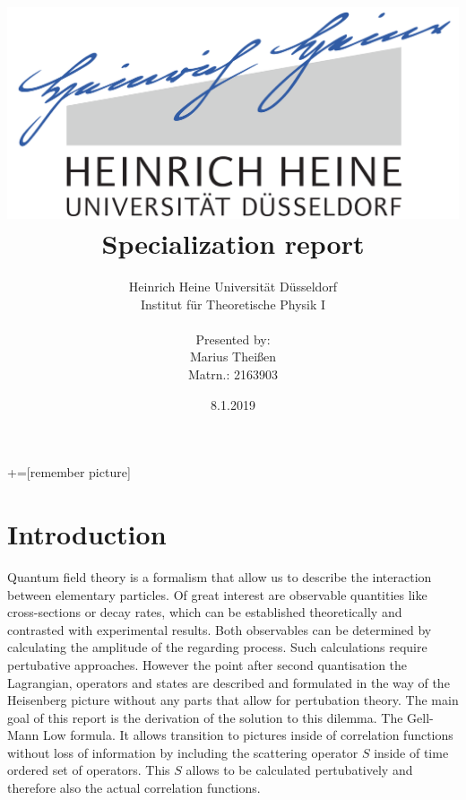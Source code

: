 \documentclass[12pt, titlepage]{article}
\title{\includegraphics[scale=0.07]{logo}\\Specialization report}
\date{8.1.2019}
\author{ Heinrich Heine Universit\"at D\"usseldorf\\ Institut f\"ur Theoretische Physik I\\  \\Presented by:\\Marius Thei\ss{}en\\ Matrn.: 2163903 \\  }
\begin{document}
+=[remember picture]
\everymath{\displaystyle}

\maketitle %
\tableofcontents
\newpage
\section{Introduction}\label{Introduction}
Quantum field theory is a formalism that allow us to describe the interaction between elementary particles. Of great interest are observable quantities like cross-sections or decay rates, which can be established theoretically and contrasted with experimental results. Both observables can be determined by calculating the amplitude of the regarding process. Such calculations require pertubative approaches. However the point after second quantisation the Lagrangian, operators and states are described and formulated in the way of the Heisenberg picture without any parts that allow for pertubation theory. The main goal of this report is the derivation of the solution to this dilemma. The Gell-Mann Low formula. It allows transition to pictures inside of correlation functions without loss of information by including the scattering operator $ S $ inside of time ordered set of operators. This $ S $ allows to be calculated pertubatively and therefore also the actual correlation functions.  
\end{document}
